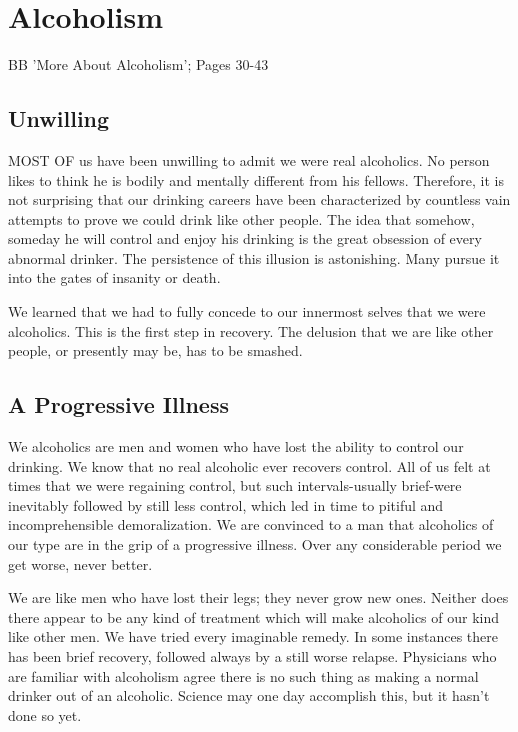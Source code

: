 
\chapter{Alcoholism}

BB 'More About Alcoholism'; Pages 30-43

\section{Unwilling}

MOST OF us have been unwilling to admit we were real alcoholics. 
No person likes to think he is bodily and mentally different from his fellows.  
Therefore, it is not surprising that our drinking careers 
have been characterized by countless vain attempts to prove we could drink like other people.  
The idea that somehow, someday 
he will control and enjoy his drinking is the great obsession of every abnormal drinker.  
The persistence of this illusion is astonishing.  
Many pursue it into the gates of insanity or death.

We learned that we had to fully concede to our innermost selves that we were alcoholics. 
This is the first step in recovery. 
The delusion that we are like other people, or presently may be, has to be smashed.


\section{A Progressive Illness}

We alcoholics are men and women who have lost the ability to control our drinking. 
We know that no real alcoholic ever recovers control. 
All of us felt at times that we were regaining control, 
but such intervals-usually brief-were inevitably followed by still less control, 
which led in time to pitiful and incomprehensible demoralization. 
We are convinced to a man that alcoholics of our type are in the grip of a progressive illness. 
Over any considerable period we get worse, never better.

We are like men who have lost their legs; they never grow new ones. 
Neither does there appear to be any kind of treatment which will make alcoholics of our kind like other men. 
We have tried every imaginable remedy. 
In some instances there has been brief recovery, followed always by a still worse relapse. 
Physicians who are familiar with alcoholism 
agree there is no such thing as making a normal drinker out of an alcoholic. 
Science may one day accomplish this, but it hasn't done so yet.



